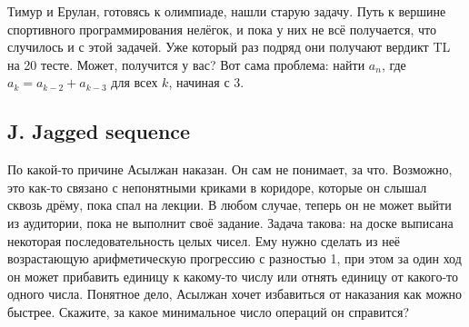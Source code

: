 Тимур и Ерулан, готовясь к олимпиаде, нашли старую задачу. Путь к вершине спортивного программирования нелёгок, и пока у них не всё получается, что случилось и с этой задачей. Уже который раз подряд они получают вердикт TL на 20 тесте. Может, получится у вас? Вот сама проблема: найти $a_n$, где $a_k = a_{k-2} + a_{k-3}$ для всех $k$, начиная с 3.






\subsection*{J. Jagged sequence}

По какой-то причине Асылжан наказан. Он сам не понимает, за что. Возможно, это как-то связано с непонятными криками в коридоре, которые он слышал сквозь дрёму, пока спал на лекции. В любом случае, теперь он не может выйти из аудитории, пока не выполнит своё задание. Задача такова: на доске выписана некоторая последовательность целых чисел. Ему нужно сделать из неё возрастающую арифметическую прогрессию с разностью 1, при этом за один ход он может прибавить единицу к какому-то числу или отнять единицу от какого-то одного числа. Понятное дело, Асылжан хочет избавиться от наказания как можно быстрее. Скажите, за какое минимальное число операций он справится?




